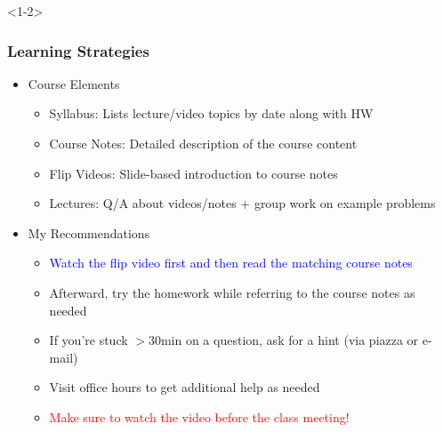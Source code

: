 \documentclass[10pt,english,aspectratio=169]{beamer}
\begin{document}
\begin{frame}
\begin{itemize}
\begin{itemize}
\end{itemize}
\end{itemize}


\end{frame}


\begin{frame}<1-2> \frametitle{Learning Strategies}

\begin{itemize}
\item<1-> Course Elements \vspace{1mm}

\begin{itemize}
  \setlength\itemsep{2mm}
  \item Syllabus: Lists lecture/video topics by date along with HW
  \item Course Notes: Detailed description of the course content
  \item Flip Videos: Slide-based introduction to course notes \smash{\Smiley[1.4][yellow]}
  \item Lectures: Q/A about videos/notes + group work on example problems \vspace{4mm}
\end{itemize}

\item<2-> My Recommendations \vspace{1mm}

\begin{itemize}
  \setlength\itemsep{2mm}
  \item \textcolor{blue}{Watch the flip video first and then read the matching course notes}
  \item Afterward, try the homework while referring to the course notes as needed
  \item If you're stuck $>\!30$min on a question, ask for a hint (via piazza or e-mail)
  \item Visit office hours to get additional help as needed
  \item \textcolor{red}{Make sure to watch the video before the class meeting!}
\end{itemize}


\end{itemize}
\end{frame}
\end{document}
